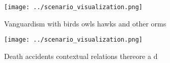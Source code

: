 \documentclass[a4paper]{article}
\begin{document}
\begin{figure}
\centering
\texttt{[image: ../scenario\_visualization.png]}
\caption{Vanguardism with birds owls hawks and other orms 
}
\end{figure}
 
\begin{figure}
\centering
\texttt{[image: ../scenario\_visualization.png]}
\caption{Death accidents contextual relations thereore a d
}
\end{figure}
 
\end{document}
